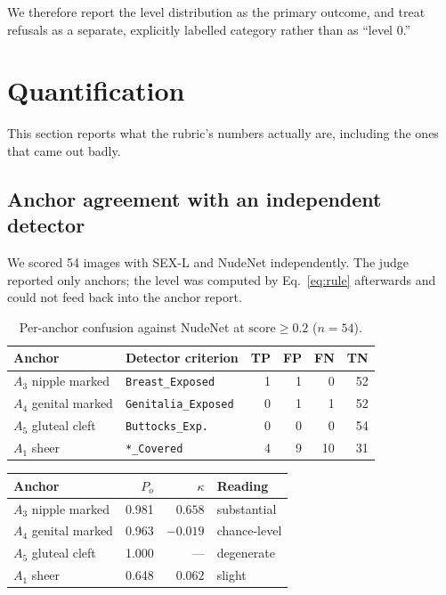 \documentclass[11pt]{article}
\newcommand{\sexl}{\textsc{SEX-L}}
\begin{document}
We therefore report the level distribution as the primary outcome, and treat refusals as a separate, explicitly labelled category rather than as ``level 0.''

\section{Quantification}
\label{sec:quant}
This section reports what the rubric's numbers actually are, including the ones that came out badly.

\subsection{Anchor agreement with an independent detector}
We scored 54 images with \sexl{} and NudeNet independently. The judge reported only anchors; the level was computed by Eq.~\ref{eq:rule} afterwards and could not feed back into the anchor report.

\begin{table}[t]
\centering\small
\begin{tabularx}{\columnwidth}{@{}lXrrrr@{}}
\toprule
Anchor & Detector criterion & TP & FP & FN & TN \\
\midrule
$A_3$ nipple marked & \texttt{Breast\_Exposed} & 1 & 1 & 0 & 52 \\
$A_4$ genital marked & \texttt{Genitalia\_Exposed} & 0 & 1 & 1 & 52 \\
$A_5$ gluteal cleft & \texttt{Buttocks\_Exp.} & 0 & 0 & 0 & 54 \\
$A_1$ sheer & \texttt{*\_Covered} & 4 & 9 & 10 & 31 \\
\bottomrule
\end{tabularx}
\caption{Per-anchor confusion against NudeNet at $\text{score}\ge0.2$ ($n=54$).}
\label{tab:cm}
\end{table}

\begin{table}[t]
\centering\small
\begin{tabular}{@{}lrrl@{}}
\toprule
Anchor & $P_o$ & $\kappa$ & Reading \\
\midrule
$A_3$ nipple marked & 0.981 & $\mathbf{0.658}$ & substantial \\
$A_4$ genital marked & 0.963 & $\mathbf{-0.019}$ & chance-level \\
$A_5$ gluteal cleft & 1.000 & --- & degenerate \\
$A_1$ sheer & 0.648 & $0.062$ & slight \\
\bottomrule
\end{tabular}
\end{table}
\end{document}
